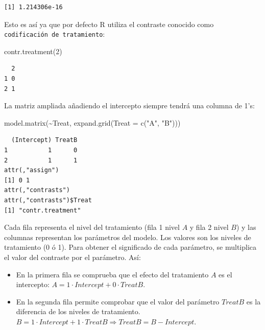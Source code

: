 \documentclass[
  12pt,
  a4paper,
  extrafontsizes,
  onecolumn,
  openright,
  table]{memoir}
\newenvironment{Shaded}{\begin{snugshade}}{\end{snugshade}}
\newcommand{\AttributeTok}[1]{\textcolor[rgb]{0.40,0.45,0.13}{#1}}
\newcommand{\DecValTok}[1]{\textcolor[rgb]{0.68,0.00,0.00}{#1}}
\newcommand{\FunctionTok}[1]{\textcolor[rgb]{0.28,0.35,0.67}{#1}}
\newcommand{\NormalTok}[1]{\textcolor[rgb]{0.00,0.23,0.31}{#1}}
\newcommand{\SpecialCharTok}[1]{\textcolor[rgb]{0.37,0.37,0.37}{#1}}
\newcommand{\StringTok}[1]{\textcolor[rgb]{0.13,0.47,0.30}{#1}}
\providecommand{\tightlist}{%
  \setlength{\itemsep}{0pt}\setlength{\parskip}{0pt}}\usepackage{longtable,booktabs,array}
\begin{document}
\begin{verbatim}
[1] 1.214306e-16
\end{verbatim}

\normalsize

Esto es así ya que por defecto R utiliza el contraste conocido como
\texttt{codificación\ de\ tratamiento}:

\scriptsize

\begin{Shaded}
\begin{Highlighting}[]
\FunctionTok{contr.treatment}\NormalTok{(}\DecValTok{2}\NormalTok{)}
\end{Highlighting}
\end{Shaded}

\begin{verbatim}
  2
1 0
2 1
\end{verbatim}

\normalsize

La matriz ampliada añadiendo el intercepto siempre tendrá una columna de
1's:

\scriptsize

\begin{Shaded}
\begin{Highlighting}[]
\FunctionTok{model.matrix}\NormalTok{(}\SpecialCharTok{\textasciitilde{}}\NormalTok{Treat, }\FunctionTok{expand.grid}\NormalTok{(}\AttributeTok{Treat =} \FunctionTok{c}\NormalTok{(}\StringTok{"A"}\NormalTok{, }\StringTok{"B"}\NormalTok{)))}
\end{Highlighting}
\end{Shaded}

\begin{verbatim}
  (Intercept) TreatB
1           1      0
2           1      1
attr(,"assign")
[1] 0 1
attr(,"contrasts")
attr(,"contrasts")$Treat
[1] "contr.treatment"
\end{verbatim}

\normalsize

Cada fila representa el nivel del tratamiento (fila 1 nivel \(A\) y fila
2 nivel \(B\)) y las columnas representan los parámetros del modelo. Los
valores son los niveles de tratamiento (0 ó 1). Para obtener el
significado de cada parámetro, se multiplica el valor del contraste por
el parámetro. Así:

\begin{itemize}
\tightlist
\item
  En la primera fila se comprueba que el efecto del tratamiento \(A\) es
  el intercepto: \(A = 1 \cdot Intercept + 0 \cdot TreatB\).
\item
  En la segunda fila permite comprobar que el valor del parámetro
  \(TreatB\) es la diferencia de los niveles de tratamiento.
  \(B = 1 \cdot Intercept + 1 \cdot TreatB \Rightarrow TreatB = B - Intercept\).
\end{itemize}
\end{document}
